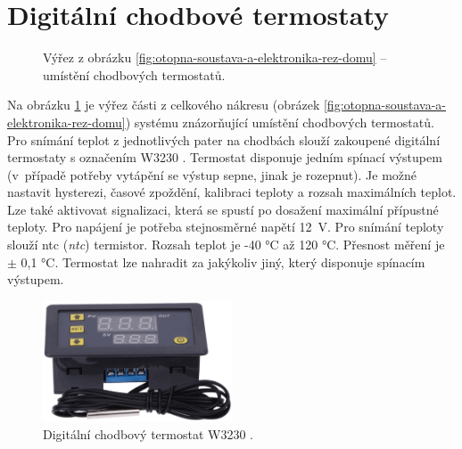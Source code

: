 \section{Digitální chodbové termostaty}
\label{sec:digitalni-chodbove-termostaty}
\begin{figure}[H]
   \centering
   \def\svgwidth{0.4\columnwidth}
   
    \caption[Výřez pro umístění chodbových termostatů.]{Výřez z obrázku \ref{fig:otopna-soustava-a-elektronika-rez-domu} – umístění chodbových termostatů.}
    \label{fig:vyrez-lokalni-termostaty}
\end{figure}

Na obrázku \ref{fig:vyrez-lokalni-termostaty} je výřez části z celkového nákresu (obrázek \ref{fig:otopna-soustava-a-elektronika-rez-domu}) systému znázorňující umístění chodbových termostatů. Pro snímání teplot z jednotlivých pater na chodbách slouží zakoupené digitální termostaty s označením W3230 \cite{digitalni-termostat-w3230}. Termostat disponuje jedním spínací výstupem (v~případě potřeby vytápění se výstup sepne, jinak je rozepnut). Je možné nastavit hysterezi, časové zpoždění, kalibraci teploty a rozsah maximálních teplot. Lze také aktivovat signalizaci, která se spustí po dosažení maximální přípustné teploty. Pro napájení je potřeba stejnosměrné napětí 12~V. Pro snímání teploty slouží  \acrshort{ntc} (\textit{\acrlong{ntc}}) termistor. Rozsah teplot je -40 °C až 120 °C. Přesnost měření je $\pm$ 0,1 °C. Termostat lze nahradit za jakýkoliv jiný, který disponuje spínacím výstupem.


\begin{figure}[H]
    \centering
    \includegraphics[width=0.5\textwidth]{images/digitalni-termostat-w3230.png}
    \caption[Digitální chodbový termostat W3230.]{Digitální chodbový termostat W3230 \cite{digitalni-termostat-w3230}.}
    \label{fig:digitalni-termostat-w3230}
\end{figure}